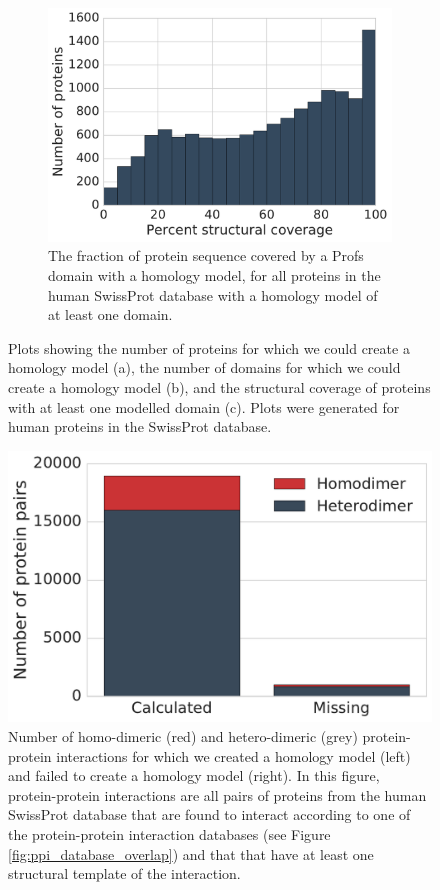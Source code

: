 \begin{figure}[!tb]
	\begin{subfigure}{0.55\textwidth}
		\centering
		\includegraphics[width=1\linewidth]{static/elaspic_training_set/elaspic_statistics/structural_coverage_hist.pdf}
		\caption{The fraction of protein sequence covered by a Profs domain with a homology model, for all proteins in the human SwissProt database with a homology model of at least one domain.}
	\end{subfigure}
	\vspace*{5mm}

	\caption[Precalculated homology models of human proteins.]{Plots showing the number of proteins for which we could create a homology model (a), the number of domains for which we could create a homology model (b), and the structural coverage of proteins with at least one modelled domain (c). Plots were generated for human proteins in the SwissProt database.}

\end{figure}


\begin{figure}[!tb]
	\centering
	\includegraphics[width=0.5\linewidth]{static/elaspic_training_set/elaspic_statistics/missing_model_protein_pair_novarsplice.pdf}
	\caption[Precalculated homology models of human protein-protein interactions.]{Number of homo-dimeric (red) and hetero-dimeric (grey) protein-protein interactions for which we created a homology model (left) and failed to create a homology model (right). In this figure, protein-protein interactions are all pairs of proteins from the human SwissProt database that are found to interact according to one of the protein-protein interaction databases (see Figure \ref{fig:ppi_database_overlap}) and that that have at least one structural template of the interaction.}
\end{figure}
